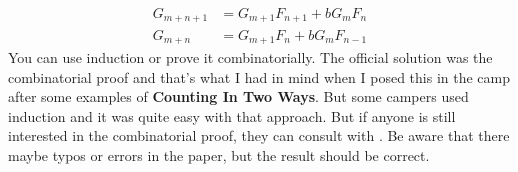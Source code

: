 \documentclass{subfile}
\begin{document}
	\begin{hint}
		\begin{align*}
			G_{m+n+1} & = G_{m+1}F_{n+1}+bG_mF_n\\
			G_{m+n}	  & = G_{m+1}F_n+bG_{m}F_{n-1}
		\end{align*}
		You can use induction or prove it combinatorially. The official solution was the combinatorial proof and that's what I had in mind when I posed this in the camp after some examples of \textbf{Counting In Two Ways}. But some campers used induction and it was quite easy with that approach. But if anyone is still interested in the combinatorial proof, they can consult with \cite{masum}. Be aware that there maybe typos or errors in the paper, but the result should be correct.
	\end{hint}
	
	\newpage
	
\end{document}
